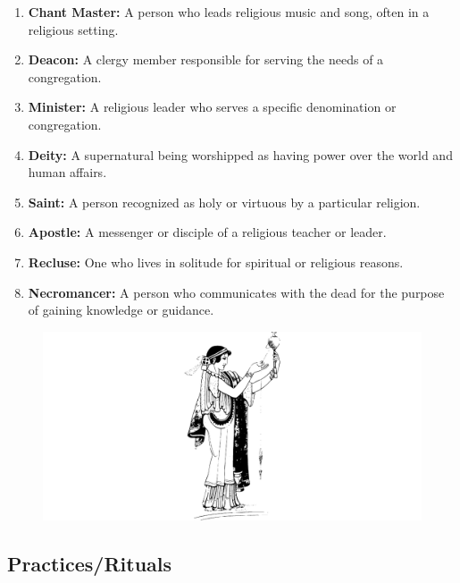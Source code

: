 \documentclass[12pt]{book}
\begin{document}
\begin{enumerate}
    \item \textbf{Chant Master:} A person who leads religious music and song, often in a religious setting.
    \item \textbf{Deacon:} A clergy member responsible for serving the needs of a congregation.
    \item \textbf{Minister:} A religious leader who serves a specific denomination or congregation.
    \item \textbf{Deity:} A supernatural being worshipped as having power over the world and human affairs.
    \item \textbf{Saint:} A person recognized as holy or virtuous by a particular religion.
    \item \textbf{Apostle:} A messenger or disciple of a religious teacher or leader.
    \item \textbf{Recluse:} One who lives in solitude for spiritual or religious reasons.
    \item \textbf{Necromancer:} A person who communicates with the dead for the purpose of gaining knowledge or guidance.
\end{enumerate}

\begin{figure}[h]
    \centering
    \includegraphics[width=\textwidth]{./images/religion02.pdf}
\end{figure}

\subsection{\textbf{Practices/Rituals}}
\end{document}

